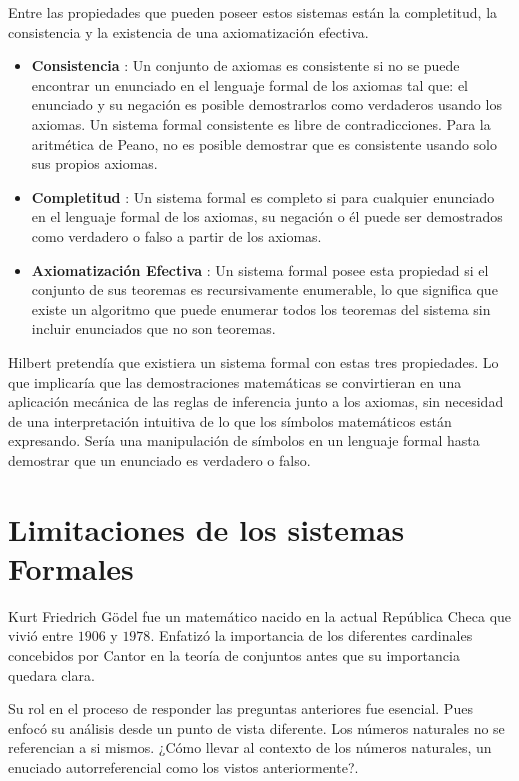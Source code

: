 \documentclass[14pt]{extarticle}
\begin{document}
Entre las propiedades que pueden poseer estos sistemas están la completitud, la consistencia y la existencia de una axiomatización efectiva. 

\begin{itemize}
    \item \textbf{Consistencia} \cite{enderton2001consistency} : Un conjunto de axiomas es consistente si no se puede encontrar un enunciado en el lenguaje formal de los axiomas tal que: el enunciado y su negación es posible demostrarlos como verdaderos usando los axiomas. Un sistema formal consistente es libre de contradicciones. Para la aritmética de Peano, no es posible demostrar que es consistente usando solo sus propios axiomas.

    \item \textbf{Completitud} \cite{enderton2001completeness}: Un sistema formal es completo si para cualquier enunciado en el lenguaje formal de los axiomas, su negación o él puede ser demostrados como verdadero o falso a partir de los axiomas. 

    \item \textbf{Axiomatización Efectiva} \cite{enderton2001effective}: Un sistema formal posee esta propiedad si el conjunto de sus teoremas es recursivamente enumerable, lo que significa que existe un algoritmo que puede enumerar todos los teoremas del sistema sin incluir enunciados que no son teoremas.
\end{itemize}

Hilbert pretendía que existiera un sistema formal con estas tres propiedades. Lo que implicaría que las demostraciones matemáticas se convirtieran en una aplicación mecánica de las reglas de inferencia junto a los axiomas, sin necesidad de una interpretación intuitiva de lo que los símbolos matemáticos están expresando. Sería una manipulación de símbolos en un lenguaje formal hasta demostrar que un enunciado es verdadero o falso.

\section{Limitaciones de los sistemas Formales}

Kurt Friedrich Gödel fue un matemático nacido en la actual República Checa que vivió entre $1906$ y $1978$. Enfatizó la importancia de los diferentes cardinales concebidos por Cantor en la teoría de conjuntos antes que su importancia quedara clara.  \cite{goedel}

Su rol en el proceso de responder las preguntas anteriores fue esencial. Pues enfocó su análisis desde un punto de vista diferente. Los números naturales no se referencian a si mismos. ¿Cómo llevar al contexto de los números naturales, un enuciado autorreferencial como los vistos anteriormente?.
\end{document}
